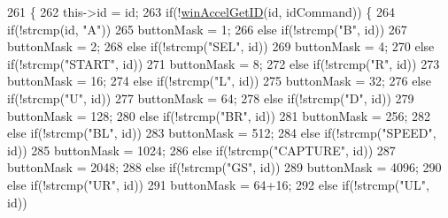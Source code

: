 \begin{DoxyCode}
261 \{
262   this->\textcolor{keywordtype}{id} = id;
263   \textcolor{keywordflow}{if}(!\mbox{\hyperlink{skin_button_8cpp_a0902750e5d4d5fc36d5a1e4bf45dc4b8}{winAccelGetID}}(\textcolor{keywordtype}{id}, idCommand)) \{
264     \textcolor{keywordflow}{if}(!strcmp(\textcolor{keywordtype}{id}, \textcolor{stringliteral}{"A"}))
265       buttonMask = 1;
266     \textcolor{keywordflow}{else} \textcolor{keywordflow}{if}(!strcmp(\textcolor{stringliteral}{"B"}, \textcolor{keywordtype}{id}))
267       buttonMask = 2;
268     \textcolor{keywordflow}{else} \textcolor{keywordflow}{if}(!strcmp(\textcolor{stringliteral}{"SEL"}, \textcolor{keywordtype}{id}))
269       buttonMask = 4;
270     \textcolor{keywordflow}{else} \textcolor{keywordflow}{if}(!strcmp(\textcolor{stringliteral}{"START"}, \textcolor{keywordtype}{id}))
271       buttonMask = 8;
272     \textcolor{keywordflow}{else} \textcolor{keywordflow}{if}(!strcmp(\textcolor{stringliteral}{"R"}, \textcolor{keywordtype}{id}))
273       buttonMask = 16;
274     \textcolor{keywordflow}{else} \textcolor{keywordflow}{if}(!strcmp(\textcolor{stringliteral}{"L"}, \textcolor{keywordtype}{id}))
275       buttonMask = 32;
276     \textcolor{keywordflow}{else} \textcolor{keywordflow}{if}(!strcmp(\textcolor{stringliteral}{"U"}, \textcolor{keywordtype}{id}))
277       buttonMask = 64;
278     \textcolor{keywordflow}{else} \textcolor{keywordflow}{if}(!strcmp(\textcolor{stringliteral}{"D"}, \textcolor{keywordtype}{id}))
279       buttonMask = 128;
280     \textcolor{keywordflow}{else} \textcolor{keywordflow}{if}(!strcmp(\textcolor{stringliteral}{"BR"}, \textcolor{keywordtype}{id}))
281       buttonMask = 256;
282     \textcolor{keywordflow}{else} \textcolor{keywordflow}{if}(!strcmp(\textcolor{stringliteral}{"BL"}, \textcolor{keywordtype}{id}))
283       buttonMask = 512;
284     \textcolor{keywordflow}{else} \textcolor{keywordflow}{if}(!strcmp(\textcolor{stringliteral}{"SPEED"}, \textcolor{keywordtype}{id}))
285       buttonMask = 1024;
286     \textcolor{keywordflow}{else} \textcolor{keywordflow}{if}(!strcmp(\textcolor{stringliteral}{"CAPTURE"}, \textcolor{keywordtype}{id}))
287       buttonMask = 2048;
288     \textcolor{keywordflow}{else} \textcolor{keywordflow}{if}(!strcmp(\textcolor{stringliteral}{"GS"}, \textcolor{keywordtype}{id}))
289       buttonMask = 4096;
290     \textcolor{keywordflow}{else} \textcolor{keywordflow}{if}(!strcmp(\textcolor{stringliteral}{"UR"}, \textcolor{keywordtype}{id}))
291       buttonMask = 64+16;
292     \textcolor{keywordflow}{else} \textcolor{keywordflow}{if}(!strcmp(\textcolor{stringliteral}{"UL"}, \textcolor{keywordtype}{id}))

\end{DoxyCode}
